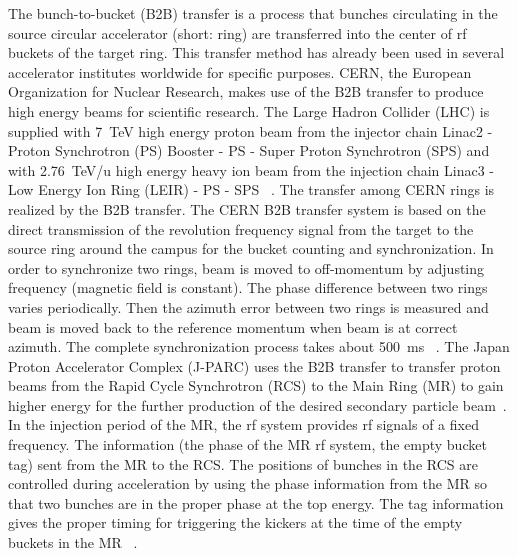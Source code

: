 The bunch-to-bucket (B2B) transfer is a process that bunches circulating in the source circular accelerator (short: ring) are transferred into the center of rf buckets of the target ring. This transfer method has already been used in several accelerator institutes worldwide for specific purposes. CERN, the European Organization for Nuclear Research, makes use of the B2B transfer to produce high energy beams for scientific research. The Large Hadron Collider (LHC) is supplied with \SI{7}{TeV} high energy proton beam from the injector chain Linac2 - Proton Synchrotron (PS) Booster - PS -  Super Proton Synchrotron (SPS) and with \SI{2.76}{TeV/u} high energy heavy ion beam from the injection chain Linac3 - Low Energy Ion Ring (LEIR) - PS - SPS  ~\cite{noauthor_cern_nodate}. The transfer among CERN rings is realized by the B2B transfer. The CERN B2B transfer system is based on the direct transmission of the revolution frequency signal from the target to the source ring around the campus for the bucket counting and synchronization. In order to synchronize two rings, beam is moved to off-momentum by adjusting frequency (magnetic field is constant). The phase difference between two rings varies periodically. Then the azimuth error between two rings is measured and beam is moved back to the reference momentum when beam is at correct azimuth. The complete synchronization process takes about \SI{500}{\ms} ~\cite{damerau_lecture_2017}. The Japan Proton Accelerator Complex (J-PARC) uses the B2B transfer to transfer proton beams from the Rapid Cycle Synchrotron (RCS) to the Main Ring (MR) to gain higher energy for the further production of the desired secondary particle beam~\cite{noauthor_j-parc_2016}. In the injection period of the MR, the rf system provides rf signals of a fixed frequency. The information (the phase of the MR rf system, the empty bucket tag) sent from the MR to the RCS. The positions of bunches in the RCS are controlled during acceleration by using the phase information from the MR so that two bunches are in the proper phase at the top energy. The tag information gives the proper timing for triggering the kickers at the time of the empty buckets in the MR ~\cite{tamura_synchronization_2006}. 


